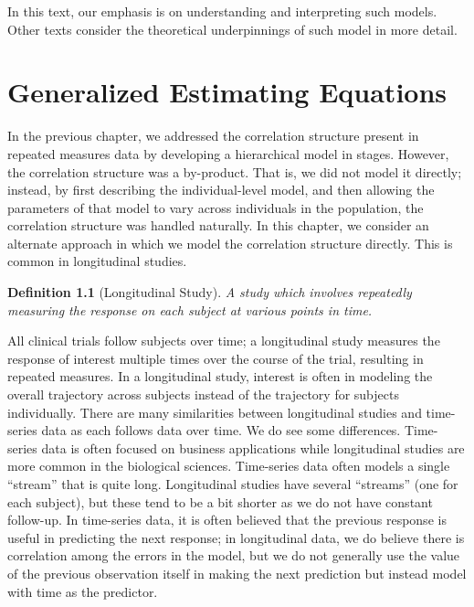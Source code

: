 \documentclass[
]{book}
\theoremstyle{plain}
\theoremstyle{mydefn}
\newtheorem{definition}{Definition}[chapter]
\theoremstyle{myexmpl}
\theoremstyle{remark}
\begin{document}
In this text, our emphasis is on understanding and interpreting such models. Other texts consider the theoretical underpinnings of such model in more detail.

\hypertarget{rm-gee}{%
\chapter{Generalized Estimating Equations}\label{rm-gee}}

In the previous chapter, we addressed the correlation structure present in repeated measures data by developing a hierarchical model in stages. However, the correlation structure was a by-product. That is, we did not model it directly; instead, by first describing the individual-level model, and then allowing the parameters of that model to vary across individuals in the population, the correlation structure was handled naturally. In this chapter, we consider an alternate approach in which we model the correlation structure directly. This is common in longitudinal studies.

\begin{definition}[Longitudinal Study]
\protect\hypertarget{def:defn-longitudinal-study}{}{\label{def:defn-longitudinal-study} {} }A study which involves repeatedly measuring the response on each subject at various points in time.
\end{definition}

All clinical trials follow subjects over time; a longitudinal study measures the response of interest multiple times over the course of the trial, resulting in repeated measures. In a longitudinal study, interest is often in modeling the overall trajectory across subjects instead of the trajectory for subjects individually. There are many similarities between longitudinal studies and time-series data as each follows data over time. We do see some differences. Time-series data is often focused on business applications while longitudinal studies are more common in the biological sciences. Time-series data often models a single ``stream'' that is quite long. Longitudinal studies have several ``streams'' (one for each subject), but these tend to be a bit shorter as we do not have constant follow-up. In time-series data, it is often believed that the previous response is useful in predicting the next response; in longitudinal data, we do believe there is correlation among the errors in the model, but we do not generally use the value of the previous observation itself in making the next prediction but instead model with time as the predictor.
\end{document}
